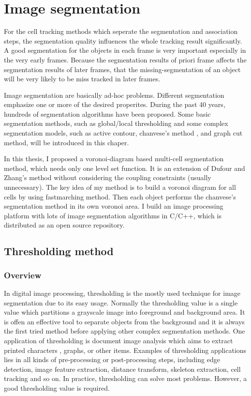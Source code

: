 \chapter{Image segmentation} \label{chpt:imgseg}
For the cell tracking methods which seperate the segmentation and association steps, the segmentation quality influences the whole tracking result significantly. A good segmentation for the objects in each frame is very important especially in the very early frames. Because the segmentation results of priori frame affects the segmentation results of later frames, that the missing-segmentation of an object will be very likely to be miss tracked in later frames.

Image segmentation are basically ad-hoc problems. Different segmentation emphasize one or more of the desired properites. During the past 40 years, hundreds of segmentation algorithms have been proposed\cite{freixenet2002yet}. Some basic segmentation methods, such as global/local thresholding and some complex segmentation models, such as active contour, chanvese's method , and graph cut method, will be introduced in this chaper.

In this thesis, I proposed a voronoi-diagram based multi-cell segmentation method, which needs only one level set function. It is an extension of Dufour \cite{dufour2005segmenting} and Zhang's method \cite{zhang2004tracking} without considering the coupling constraints (usually unnecessary). The key idea of my method is to build a voronoi diagram for all cells by using fastmarching method. Then each object performs the chanvese's segmentation method in its own voronoi area. I build an image processing platform with lots of image segmentation algorithms in C/C++, which is distributed as an open source repository.
\section{Thresholding method}
\subsection{Overview}
In digital image processing, thresholding is the mostly used technique for image segmentation due to its easy usage. Normally the thresholding value is a single value which partitions a grayscale image into foreground and background area. It is offen an effective tool to separate objects from the background and it is always the first tried method before applying other complex segmentation methods. One application of thresholding is document image analysis which aims to extract printed characters \cite{kamel1993extraction,abak1997performance}, graphs, or other items. Examples of thresholding applications lies in all kinds of pre-processing or post-processing steps, including edge detection, image feature extraction, distance transform, skeleton extraction, cell tracking and so on. In practice, thresholding can solve most problems. However, a good thresholding value is required.

